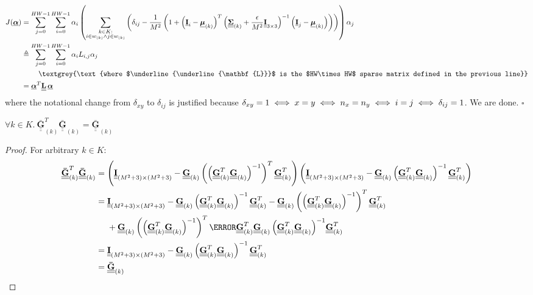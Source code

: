 \documentclass{article}
\def\vt#1{\underline{\mathbf{#1}}}
\def\vts#1{\underline{\boldsymbol{#1}}}
\def\mt#1{\underline{\underline{\mathbf{#1}}}}
\def\mts#1{\underline{\underline{\boldsymbol{#1}}}}
\begin{document}
\begin{align*}
    J(\vts\alpha) &= \sum_{j=0}^{HW-1} \sum_{i=0}^{HW-1} \alpha_i \left(\sum_{\substack{k\in K:\\i\in w_{(k)}\wedge j\in w_{(k)}}} \left( \delta_{ij} - \frac1{M^2}\left(1 + \left(\vt{I}_{i} - \vts \mu_{(k)}\right)^T \left(\mts \Sigma_{(k)} + \frac\epsilon{M^2} \mt{I}_{3\times 3}\right)^{-1} \left(\vt{I}_{j} - \vts \mu_{(k)}\right) \right) \right)\right) \alpha_j\\
    &\triangleq \sum_{j=0}^{HW-1} \sum_{i=0}^{HW-1} \alpha_i L_{i,j} \alpha_j\\
    &\quad\quad\ \textgrey{\text{where $\mt L$ is the $HW\times HW$ sparse matrix defined in the previous line}}\\
    &= \vts \alpha^T \mt L\, \vts \alpha
\end{align*}
where the notational change from $\delta_{xy}$ to $\delta_{ij}$ is justified because $\delta_{xy} = 1 \iff x=y \iff n_x = n_y \iff i = j\\ \iff \delta_{ij}=1$. We are done. \hfill$\square$


\begin{lemma}\label{lemma1}
    $\forall k \in K.\ \mt{\bar{G}}_{(k)}^T \mt{\bar{G}}_{(k)} = \mt{\bar{G}}_{(k)}$
    \begin{proof}
        For arbitrary $k\in K$:
        \begin{align*}
            \mt{\bar{G}}_{(k)}^T \mt{\bar{G}}_{(k)} &= \left(\mt I_{(M^2+3)\times(M^2+3)} -  \mt G_{(k)} \left(\left(\mt G_{(k)}^T \mt G_{(k)} \right)^{-1}\right)^T \mt G_{(k)}^T \right) \left(\mt I_{(M^2+3)\times(M^2+3)} -  \mt G_{(k)}\left(\mt G_{(k)}^T \mt G_{(k)} \right)^{-1} \mt G_{(k)}^T \right)\\
            &= \mt I_{(M^2+3)\times(M^2+3)} - \mt G_{(k)}\left(\mt G_{(k)}^T \mt G_{(k)} \right)^{-1} \mt G_{(k)}^T - \mt G_{(k)} \left(\left(\mt G_{(k)}^T \mt G_{(k)} \right)^{-1}\right)^T \mt G_{(k)}^T \\
            &\quad\ + \mt G_{(k)} \left(\left(\mt G_{(k)}^T \mt G_{(k)} \right)^{-1}\right)^T \cancel{\mt G_{(k)}^T \mt G_{(k)}\left(\mt G_{(k)}^T \mt G_{(k)} \right)^{-1}} \mt G_{(k)}^T \\
            &= \mt I_{(M^2+3)\times(M^2+3)} - \mt G_{(k)}\left(\mt G_{(k)}^T \mt G_{(k)} \right)^{-1} \mt G_{(k)}^T \\
            &= \mt{\bar{G}}_{(k)}
        \end{align*}
    \end{proof}
\end{lemma}
\end{document}
